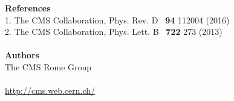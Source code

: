 \documentclass[twocolumn,twoside,10pt,nodate]{article}
\begin{document}


\vfill
\small{
\noindent
\textbf{References}
\\
1. The CMS Collaboration, Phys. Rev. D \ \textbf{94} 112004 (2016) \\
2. The CMS Collaboration, Phys. Lett. B \ \textbf{722} 273 (2013)
\\
\\
\noindent
\textbf{Authors}
\\
The CMS Rome Group
\\
\\
\url{http://cms.web.cern.ch/}
\\
\\
\noindent
%
%
%
}
\end{document}
